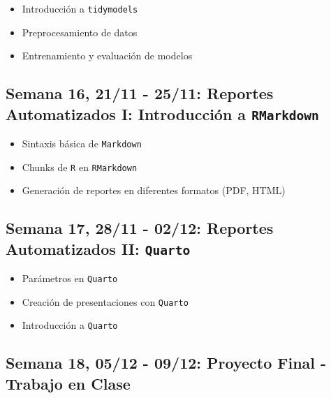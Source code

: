 \documentclass[11pt,letter,]{article}
\providecommand{\tightlist}{%
  \setlength{\itemsep}{0pt}\setlength{\parskip}{0pt}}
\begin{document}
\begin{itemize}
\tightlist
\item
  Introducción a \texttt{tidymodels}
\item
  Preprocesamiento de datos
\item
  Entrenamiento y evaluación de modelos
\end{itemize}

\hypertarget{semana-16-2111---2511-reportes-automatizados-i-introducciuxf3n-a-rmarkdown}{%
\subsection{\texorpdfstring{Semana 16, 21/11 - 25/11: Reportes
Automatizados I: Introducción a
\texttt{RMarkdown}}{Semana 16, 21/11 - 25/11: Reportes Automatizados I: Introducción a RMarkdown}}\label{semana-16-2111---2511-reportes-automatizados-i-introducciuxf3n-a-rmarkdown}}

\begin{itemize}
\tightlist
\item
  Sintaxis básica de \texttt{Markdown}
\item
  Chunks de \texttt{R} en \texttt{RMarkdown}
\item
  Generación de reportes en diferentes formatos (PDF, HTML)
\end{itemize}

\hypertarget{semana-17-2811---0212-reportes-automatizados-ii-quarto}{%
\subsection{\texorpdfstring{Semana 17, 28/11 - 02/12: Reportes
Automatizados II:
\texttt{Quarto}}{Semana 17, 28/11 - 02/12: Reportes Automatizados II: Quarto}}\label{semana-17-2811---0212-reportes-automatizados-ii-quarto}}

\begin{itemize}
\tightlist
\item
  Parámetros en \texttt{Quarto}
\item
  Creación de presentaciones con \texttt{Quarto}
\item
  Introducción a \texttt{Quarto}
\end{itemize}

\hypertarget{semana-18-0512---0912-proyecto-final---trabajo-en-clase}{%
\subsection{Semana 18, 05/12 - 09/12: Proyecto Final - Trabajo en
Clase}\label{semana-18-0512---0912-proyecto-final---trabajo-en-clase}}
\end{document}
